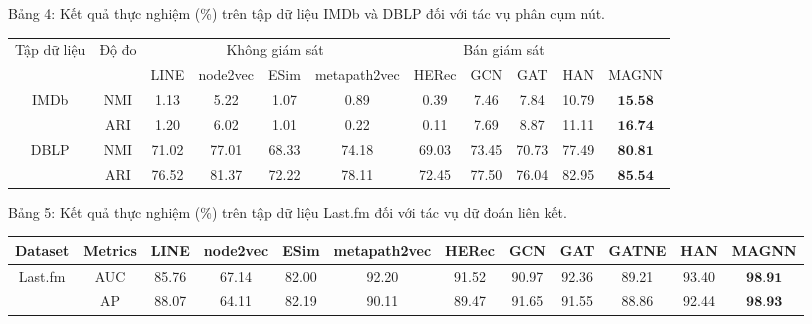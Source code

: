 Bảng 4: Kết quả thực nghiệm (\%) trên tập dữ liệu IMDb và DBLP đối với tác vụ phân cụm nút. 
\begin{center}
\begin{tabular}{|c|c|c|c|c|c|c|c|c|c|c|}
\hline
\multirow{2}{*}{Tập dữ liệu} & \multirow{2}{*}{Độ đo} & \multicolumn{4}{|c|}{Không giám sát} & \multicolumn{4}{c|}{Bán giám sát} &  \\
\cline { 3 - 11 }
 &  & LINE & node2vec & ESim & metapath2vec & HERec & GCN & GAT & HAN & MAGNN \\
\hline
\multirow{2}{*}{IMDb} & NMI & 1.13 & 5.22 & 1.07 & 0.89 & 0.39 & 7.46 & 7.84 & 10.79 & $\mathbf{1 5 . 5 8}$ \\
\cline { 2 - 11 }
 & ARI & 1.20 & 6.02 & 1.01 & 0.22 & 0.11 & 7.69 & 8.87 & 11.11 & $\mathbf{1 6 . 7 4}$ \\
\hline
\multirow{2}{*}{DBLP} & NMI & 71.02 & 77.01 & 68.33 & 74.18 & 69.03 & 73.45 & 70.73 & 77.49 & $\mathbf{8 0 . 8 1}$ \\
\cline { 2 - 11 }
 & ARI & 76.52 & 81.37 & 72.22 & 78.11 & 72.45 & 77.50 & 76.04 & 82.95 & $\mathbf{8 5 . 5 4}$ \\
\hline
\end{tabular}
\end{center}


Bảng 5: Kết quả thực nghiệm (\%) trên tập dữ liệu Last.fm đối với tác vụ dữ đoán liên kết.
\begin{center}
\begin{tabular}{|c|c|c|c|c|c|c|c|c|c|c|c|}
\hline
Dataset & Metrics & LINE & node2vec & ESim & metapath2vec & HERec & GCN & GAT & GATNE & HAN & MAGNN \\
\hline
\multirow{2}{*}{Last.fm} & AUC & 85.76 & 67.14 & 82.00 & 92.20 & 91.52 & 90.97 & 92.36 & 89.21 & 93.40 & $\mathbf{9 8 . 9 1}$ \\
\cline { 2 - 11 }
 & AP & 88.07 & 64.11 & 82.19 & 90.11 & 89.47 & 91.65 & 91.55 & 88.86 & 92.44 & $\mathbf{9 8 . 9 3}$ \\
\hline
\end{tabular}
\end{center}
